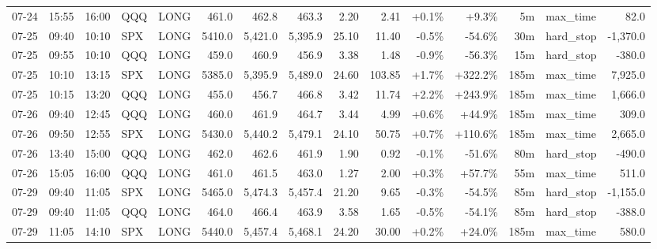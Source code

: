 \documentclass[11pt,a4paper,twoside]{article}
\begin{document}
\begin{landscape}
\begin{center}
\begin{longtable}{>{\color{txtmain}}l l l l l r r r r r r r r >{\color{txtmain}}l r}
07-24 & 15:55 & 16:00 & QQQ & LONG & 461.0 & 462.8 & 463.3 & 2.20 & 2.41 & \textcolor{wingreen}{+0.1\%} & \textcolor{wingreen}{+9.3\%} & 5m & max\_time & \textcolor{wingreen}{82.0} \\
07-25 & 09:40 & 10:10 & SPX & LONG & 5410.0 & 5,421.0 & 5,395.9 & 25.10 & 11.40 & \textcolor{lossred}{-0.5\%} & \textcolor{lossred}{-54.6\%} & 30m & hard\_stop & \textcolor{lossred}{-1,370.0} \\
07-25 & 09:55 & 10:10 & QQQ & LONG & 459.0 & 460.9 & 456.9 & 3.38 & 1.48 & \textcolor{lossred}{-0.9\%} & \textcolor{lossred}{-56.3\%} & 15m & hard\_stop & \textcolor{lossred}{-380.0} \\
07-25 & 10:10 & 13:15 & SPX & LONG & 5385.0 & 5,395.9 & 5,489.0 & 24.60 & 103.85 & \textcolor{wingreen}{+1.7\%} & \textcolor{wingreen}{+322.2\%} & 185m & max\_time & \textcolor{wingreen}{7,925.0} \\
07-25 & 10:15 & 13:20 & QQQ & LONG & 455.0 & 456.7 & 466.8 & 3.42 & 11.74 & \textcolor{wingreen}{+2.2\%} & \textcolor{wingreen}{+243.9\%} & 185m & max\_time & \textcolor{wingreen}{1,666.0} \\
07-26 & 09:40 & 12:45 & QQQ & LONG & 460.0 & 461.9 & 464.7 & 3.44 & 4.99 & \textcolor{wingreen}{+0.6\%} & \textcolor{wingreen}{+44.9\%} & 185m & max\_time & \textcolor{wingreen}{309.0} \\
07-26 & 09:50 & 12:55 & SPX & LONG & 5430.0 & 5,440.2 & 5,479.1 & 24.10 & 50.75 & \textcolor{wingreen}{+0.7\%} & \textcolor{wingreen}{+110.6\%} & 185m & max\_time & \textcolor{wingreen}{2,665.0} \\
07-26 & 13:40 & 15:00 & QQQ & LONG & 462.0 & 462.6 & 461.9 & 1.90 & 0.92 & \textcolor{lossred}{-0.1\%} & \textcolor{lossred}{-51.6\%} & 80m & hard\_stop & \textcolor{lossred}{-490.0} \\
07-26 & 15:05 & 16:00 & QQQ & LONG & 461.0 & 461.5 & 463.0 & 1.27 & 2.00 & \textcolor{wingreen}{+0.3\%} & \textcolor{wingreen}{+57.7\%} & 55m & max\_time & \textcolor{wingreen}{511.0} \\
07-29 & 09:40 & 11:05 & SPX & LONG & 5465.0 & 5,474.3 & 5,457.4 & 21.20 & 9.65 & \textcolor{lossred}{-0.3\%} & \textcolor{lossred}{-54.5\%} & 85m & hard\_stop & \textcolor{lossred}{-1,155.0} \\
07-29 & 09:40 & 11:05 & QQQ & LONG & 464.0 & 466.4 & 463.9 & 3.58 & 1.65 & \textcolor{lossred}{-0.5\%} & \textcolor{lossred}{-54.1\%} & 85m & hard\_stop & \textcolor{lossred}{-388.0} \\
07-29 & 11:05 & 14:10 & SPX & LONG & 5440.0 & 5,457.4 & 5,468.1 & 24.20 & 30.00 & \textcolor{wingreen}{+0.2\%} & \textcolor{wingreen}{+24.0\%} & 185m & max\_time & \textcolor{wingreen}{580.0} \\

\end{longtable}
\end{center}
\end{landscape}
\end{document}
